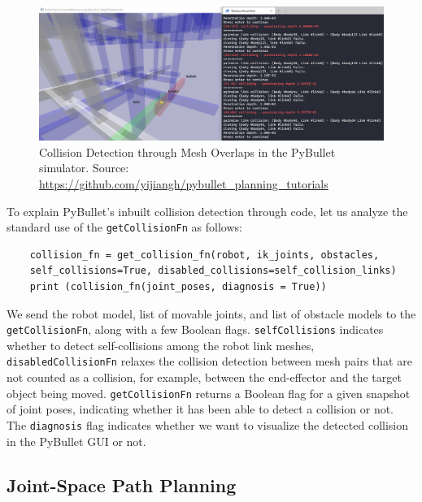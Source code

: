 \begin{figure}[ht]
    \centering
    \includegraphics[scale=0.3]{figures/bl-manipulator/assembly_collision.png}
    \caption[Collision detection through Mesh Overlap]{Collision Detection through Mesh Overlaps in the PyBullet simulator. Source:  \scriptsize{\url{https://github.com/yijiangh/pybullet_planning_tutorials}}}
    \label{fig:collisions-pybullet}
\end{figure}

To explain PyBullet's inbuilt collision detection through code, let us analyze the standard use of the \verb_getCollisionFn_ as follows:

\begin{verbatim}
    collision_fn = get_collision_fn(robot, ik_joints, obstacles, 
    self_collisions=True, disabled_collisions=self_collision_links)
    print (collision_fn(joint_poses, diagnosis = True))
\end{verbatim}

We send the robot model, list of movable joints, and list of obstacle models to the \verb_getCollisionFn_, along with a few Boolean flags. \verb_selfCollisions_ indicates whether to detect self-collisions among the robot link meshes, \verb_disabledCollisionFn_ relaxes the collision detection between mesh pairs that are not counted as a collision, for example, between the end-effector and the target object being moved. \verb_getCollisionFn_ returns a Boolean flag for a given snapshot of joint poses, indicating whether it has been able to detect a collision or not. The \verb_diagnosis_ flag indicates whether we want to visualize the detected collision in the PyBullet GUI or not.

\subsection{Joint-Space Path Planning}\label{sec:joint-cost}

